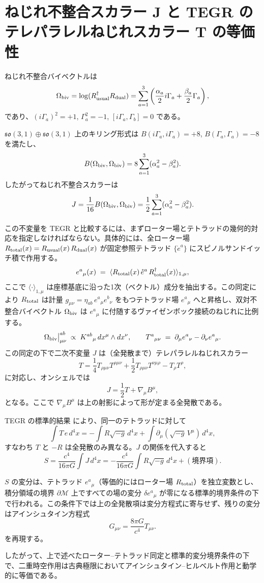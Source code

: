\documentclass[dvipdfmx,a4paper]{article}
\begin{document}
\section{ねじれ不整合スカラー J と TEGR のテレパラレルねじれスカラー T の等価性}
\label{app:TEGR-equivalence}

ねじれ不整合バイベクトルは
\[
\Omega_{\rm biv} = \log(R_{\rm usual}^\dagger R_{\rm dual}) = \sum_{a=1}^3 \left( \frac{\alpha_a}{2} i\Gamma_a + \frac{\beta_a}{2} \Gamma_a \right),
\]
であり、\( (i\Gamma_a)^2 = +1 \), \( \Gamma_a^2 = -1 \), \([i\Gamma_a, \Gamma_b] = 0\) である。

\(\mathfrak{so}(3,1) \oplus \mathfrak{so}(3,1)\) 上のキリング形式は \( B(i\Gamma_a, i\Gamma_a) = +8 \), \( B(\Gamma_a, \Gamma_a) = -8 \) を満たし、
\[
B(\Omega_{\rm biv}, \Omega_{\rm biv}) = 8 \sum_{a=1}^3 (\alpha_a^2 - \beta_a^2).
\]
したがってねじれ不整合スカラーは
\[
J = \frac{1}{16} B(\Omega_{\rm biv}, \Omega_{\rm biv}) = \frac12 \sum_{a=1}^3 (\alpha_a^2 - \beta_a^2).
\]

この不変量を TEGR と比較するには、まずローター場とテトラッドの幾何的対応を指定しなければならない。具体的には、全ローター場 $R_{\rm total}(x) = R_{\rm usual}(x)\, R_{\rm dual}(x)$ が固定参照テトラッド $\{\mathring{e}^a\}$ にスピノルサンドイッチ積で作用する。
\[
e^a{}_\mu(x) \;=\; \langle R_{\rm total}(x)\, \mathring{e}^a\, R_{\rm total}^\dagger(x) \rangle_{1,\mu},
\]
ここで $\langle \cdot \rangle_{1,\mu}$ は座標基底に沿った1次（ベクトル）成分を抽出する。この同定により $R_{\rm total}$ は計量 $g_{\mu\nu} = \eta_{ab}\, e^a{}_\mu e^b{}_\nu$ をもつテトラッド場 $e^a{}_\mu$ へと昇格し、双対不整合バイベクトル $\Omega_{\rm biv}$ は $e^a{}_\mu$ に付随するヴァイゼンボック接続のねじれに比例する。
\[
\Omega_{\rm biv}\big|_{\mu\nu}^{ab} \;\propto\; K^{ab}{}_\mu\, dx^\mu \wedge dx^\nu,
\qquad
T^a{}_{\mu\nu} \;=\; \partial_\mu e^a{}_\nu - \partial_\nu e^a{}_\mu.
\]
この同定の下で二次不変量 $J$ は（全発散まで）テレパラレルねじれスカラー
\[
T = \frac14 T_{\rho\mu\nu}T^{\rho\mu\nu} + \frac12 T_{\rho\mu\nu}T^{\nu\mu\rho} - T_\rho T^\rho,
\]
に対応し、オンシェルでは
\[
J = \frac12 T + \nabla_\mu B^\mu,
\]
となる。ここで $\nabla_\mu B^\mu$ は上の射影によって形が定まる全発散である。

TEGR の標準的結果 \cite{maluf2013} により、同一のテトラッドに対して
\[
\int T\, e\, d^4x = -\int R\sqrt{-g}\, d^4x + \int \partial_\mu(\sqrt{-g}\, V^\mu)\, d^4x,
\]
すなわち $T$ と $-R$ は全発散のみ異なる。$J$ の関係を代入すると
\[
S = \frac{c^4}{16\pi G} \int J \, d^4x = -\frac{c^4}{16\pi G} \int R \sqrt{-g}\, d^4x + (\text{境界項}).
\]

$S$ の変分は、テトラッド $e^a{}_\mu$（等価的にはローター場 $R_{\rm total}$）を独立変数とし、積分領域の境界 $\partial\mathcal{M}$ 上ですべての場の変分 $\delta e^a{}_\mu$ が零になる標準的境界条件の下で行われる。この条件下では上の全発散項は変分方程式に寄与せず、残りの変分はアインシュタイン方程式
\[
G_{\mu\nu} = \frac{8\pi G}{c^4} T_{\mu\nu}.
\]
を再現する。

したがって、上で述べたローター--テトラッド同定と標準的変分境界条件の下で、二重時空作用は古典極限においてアインシュタイン--ヒルベルト作用と動学的に等価である。
\end{document}
